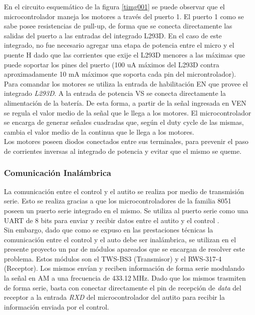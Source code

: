 \documentclass[a4paper,10pt]{article}
\begin{document}
					En el circuito esquemático de la figura \ref{timg001} se puede observar que el microcontrolador maneja los motores a través del puerto 1. El puerto 1 
					como se sabe posee resistencias de pull-up, de forma que se conecta directamente las salidas del puerto a las entradas del integrado L293D. En el caso
					de este integrado, no fue necesario agregar una etapa de potencia entre el micro y el puente H dado que las corrientes que exije el L293D menores a las
					máximas que puede soportar los pines del puerto (100 uA máximos del L293D contra aproximadamente 10 mA máximos que soporta cada pin del 
					microntrolador). \\
					\indent Para comandar los motores se utiliza la entrada de habilitación EN que provee el integrado \emph{L293D}. A la entrada de potencia
					VS se conecta directamente la alimentación de la batería.  De esta forma, a partir de la señal ingresada en VEN se regula el valor medio de la 
					señal que le llega a los motores. El microcontrolador se encarga de generar señales cuadradas que, según el duty cycle de las mismas, 
					cambia el valor medio de la continua que le llega a los motores. \\
					\indent Los motores poseen diodos conectados entre sus terminales, para prevenir el paso de corrientes inversas al integrado de potencia y evitar
					que el mismo se queme. 

				\subsubsection{Comunicación Inalámbrica}	
			 		La comunicación entre el control y el autito se realiza por medio de transmisión serie. Esto se realiza gracias a que los microcontroladores de
					la familia 8051 poseen un puerto serie integrado en el mismo. Se utiliza al puerto serie como una UART de 8 bits para enviar y recibir datos entre 
					el autito y el control . \\
					\indent Sin embargo, dado que como se 
					expuso en las prestaciones técnicas la comunicación entre el control y el auto debe ser inalámbrica, se utilizan en el presente proyecto un par
					de módulos apareados que se encargan de resolver este problema. Estos módulos son el TWS-BS3 (Transmisor) y el RWS-317-4 (Receptor). Los
					mismos envían y reciben información de forma serie modulando la señal en AM a una frecuencia de 433.12$~\text{MHz}$. Dado que los mismos trasmiten
					de forma serie, basta con conectar directamente el pin de recepción de \emph{data} del receptor a la entrada \emph{RXD} del microcontrolador del 
					autito para recibir la información enviada por el control. 
				
\end{document}
